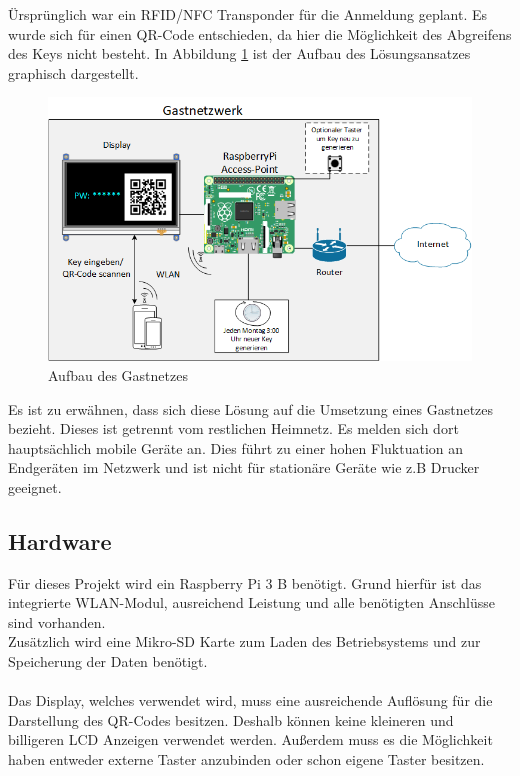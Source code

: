 \documentclass[a4paper,11pt,singlespacing]{article}
\begin{document}
		Ürsprünglich war ein RFID/NFC Transponder für die Anmeldung geplant. Es wurde sich für einen QR-Code entschieden, da hier die Möglichkeit des Abgreifens des Keys nicht besteht. In Abbildung  \ref{aufbau} ist der Aufbau des Lösungsansatzes graphisch dargestellt. 

		\begin{figure}[ht]
			\centering
			\includegraphics[scale=0.6]{skizze}
				\caption{Aufbau des Gastnetzes}
				\label{aufbau}
		\end{figure}

    	Es ist zu erwähnen, dass sich diese Lösung auf die Umsetzung eines Gastnetzes bezieht. Dieses ist getrennt vom restlichen Heimnetz. Es melden sich dort hauptsächlich mobile Geräte an. Dies führt zu einer hohen Fluktuation an Endgeräten im Netzwerk und ist nicht für stationäre Geräte wie z.B Drucker geeignet.
    
    
    	\subsection{Hardware}
			Für dieses Projekt wird ein Raspberry Pi 3 B benötigt. Grund hierfür ist das integrierte WLAN-Modul, ausreichend Leistung und alle benötigten Anschlüsse sind vorhanden. \\
			Zusätzlich wird eine Mikro-SD Karte zum Laden des Betriebsystems und zur Speicherung der Daten benötigt. \\ \\
			Das Display, welches verwendet wird, muss eine ausreichende Auflösung für die Darstellung des QR-Codes besitzen. Deshalb können keine kleineren und billigeren LCD Anzeigen verwendet werden. Außerdem muss es die Möglichkeit haben entweder externe Taster anzubinden oder schon eigene Taster besitzen.
		
\end{document}
